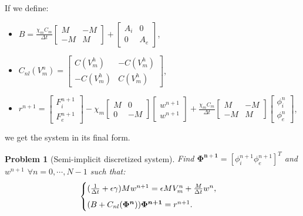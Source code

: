 \documentclass[a4paper,11pt]{article}
\newtheorem{problem}{Problem}
\begin{document}
\vspace{5mm}
\noindent If we define:
\begin{itemize}
\item $B=\frac{\chi_m C_m}{\Delta t} \begin{bmatrix} M &-M \\-M & M \end{bmatrix}+\begin{bmatrix} A_i & 0 \\ 0 & A_e \end{bmatrix}$,
\item $C_{nl}(V_m^n)=\begin{bmatrix}C(V_m^h) & -C(V_m^h) \\ -C(V_m^h) & C(V_m^h) \end{bmatrix}$,
\item $r^{n+1}=\begin{bmatrix} F_i^{n+1} \\ F_e^{n+1}\end{bmatrix}-\chi_m \begin{bmatrix}M & 0 \\ 0 & -M \end{bmatrix} \begin{bmatrix}w^{n+1} \\ w^{n+1} \end{bmatrix}+\frac{\chi_m C_m}{\Delta t} \begin{bmatrix} M &-M \\-M & M \end{bmatrix} \begin{bmatrix} \phi_i^n \\ \phi_e^n \end{bmatrix}$,
\end{itemize} \vspace{5mm}
we get the system in its final form.  \\
\begin{problem}[Semi-implicit discretized system]
Find $\bm{\Phi^{n+1}}=[\phi_i^{n+1} \phi_e^{n+1}]^T$ and $w^{n+1}$ $\forall n=0,\cdots,N-1$ such that:
\begin{equation*}
\begin{cases}
(\frac{1}{\Delta t}+\epsilon \gamma)M w^{n+1}=\epsilon M V_m^n+\frac{M}{\Delta t} w^n, \vspace{2mm} \\
(B+C_{nl}(\bm{\Phi^n})) \bm{\Phi^{n+1}}=r^{n+1}.
\end{cases}
\end{equation*} 
\end{problem}
\end{document}
